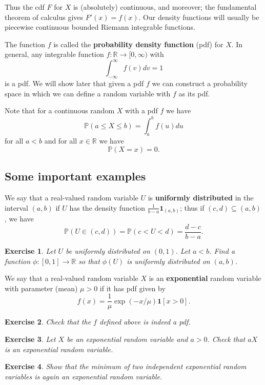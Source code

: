 \documentclass[12pt, reqno]{amsart}
\newtheorem{ex}{Exercise}[section]
\newcommand\dff[1]{\textbf{#1}}
\renewcommand{\P}{{\mathbb P}}  %
\newcommand{\R}{{\mathbb R}}
\begin{document}
Thus the cdf $F$ for $X$ is (absolutely) continuous, and moreover; the fundamental theorem of calculus gives $F'(x)= f(x)$.   Our density functions will usually be piecewise continuous bounded Riemann integrable functions.



 The function $f$ is called the \dff{probability density function} (pdf) for $X$. In general, any integrable function $f: \R \to [0, \infty)$ with 
$$\int_{-\infty} ^{\infty} f(v)dv =1$$
is a pdf.    We will show later that given a pdf $f$ we can construct a probability space in which we can define a random variable with $f$ as its pdf.

Note that for a continuous random $X$ with a pdf $f$ we have
$$\P( a\leq X \leq b ) = \int_a ^b f(u) du$$ for all $a <b$
and for all $x \in \R$ we have
$$\P(X =x) = 0.$$

\subsection{Some important examples}

We say that a real-valued random variable $U$ is \dff{uniformly distributed} in the interval $(a,b)$ if $U$ has the density function $\frac{1}{b-a}\mathbf{1}_{(a,b)}$; thus if $(c,d) \subseteq (a,b)$, we have 
$$\P(U \in (c,d))  = \P( c < U < d)= \frac{d-c}{b-a}.$$


\begin{ex}  Let $U$ be uniformly distributed on $(0,1)$.   Let $a  < b$.    Find a  function $\phi: [0,1] \to \R$ so that $\phi(U)$ is uniformly distributed on $(a,b)$.  
\end{ex}



We say that a real-valued random variable $X$ is an \dff{exponential} random variable with parameter (mean) $\mu >0$ if it has pdf given by
$$ f(x) = \frac{1}{\mu} \exp (- x / \mu) \mathbf{1}[x >0].$$

\begin{ex}  Check that the $f$ defined above is indeed a pdf.

\end{ex}

\begin{ex}  Let $X$ be an exponential random variable and $a >0$.   Check that $a X$ is an exponential random variable.

\end{ex}


\begin{ex}  Show that the minimum of two independent exponential random variables is again an exponential random variable.

\end{ex}
\end{document}
